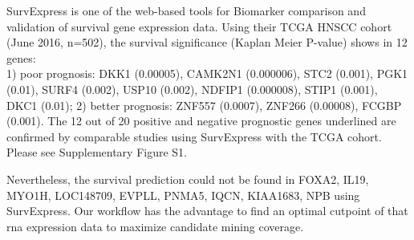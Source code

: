 \documentclass[preprint,12pt]{elsarticle}
\newenvironment{MyColorPar}[1]{%
    \leavevmode\color{#1}\ignorespaces%
}{%
}%
\begin{document}
\begin{MyColorPar}{blue}

SurvExpress\cite{Aguirre-Gamboa2013} is one of the web-based tools for Biomarker comparison and validation of survival gene expression data. Using their TCGA HNSCC cohort (June 2016, n=502), the survival significance (Kaplan Meier P-value) shows in 12 genes:\\ %
1) poor prognosis: DKK1 (0.00005), CAMK2N1 (0.000006), STC2 (0.001), PGK1 (0.01), SURF4 (0.002), USP10 (0.002), NDFIP1 (0.000008), STIP1 (0.001), DKC1 (0.01);
2) better prognosis: ZNF557 (0.0007), ZNF266 (0.00008), FCGBP (0.001).
The 12 out of 20 positive and negative prognostic genes underlined are confirmed by comparable studies using SurvExpress with the TCGA cohort. Please see Supplementary Figure S1. %


Nevertheless, the survival prediction could not be found in FOXA2, IL19, MYO1H, LOC148709, EVPLL, PNMA5, IQCN, KIAA1683, NPB using SurvExpress. 
Our workflow has the advantage to find an optimal cutpoint of that \acrshort{rna} expression data to maximize candidate mining coverage.


\end{MyColorPar}
\end{document}
